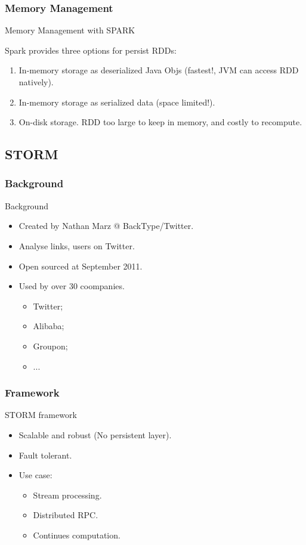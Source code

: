 \begin{frame}
\frametitle{Memory Management}
\begin{block}{Memory Management with SPARK}

Spark provides three options for persist RDDs:
\begin{enumerate}
\item In-memory storage as deserialized Java Objs (fastest!, JVM can access RDD natively).
\item In-memory storage as serialized data (space limited!).
\item On-disk storage. RDD too large to keep in memory, and costly to recompute. 
 \end{enumerate}
\end{block}
\end{frame}

\subsection{STORM}
\begin{frame}
\frametitle{Background}
\begin{block}{Background}
\begin{itemize}
\item Created by Nathan Marz @ BackType/Twitter.
\item Analyse links, users on Twitter.
\item Open sourced at September 2011.
\item Used by over 30 coompanies. 
\begin{itemize}
\item Twitter;
\item Alibaba;
\item Groupon;
\item ...
\end{itemize}
\end{itemize}

\end{block}
\end{frame}

\begin{frame}
\frametitle{Framework}
\begin{block}{STORM framework}
\begin{itemize}
\item Scalable and robust (No persistent layer).
\item Fault tolerant.
\item Use case:
  \begin{itemize}
  \item Stream processing.
  \item Distributed RPC. 
  \item Continues computation.
  \end{itemize}
\end{itemize}
\end{block}
\end{frame}

